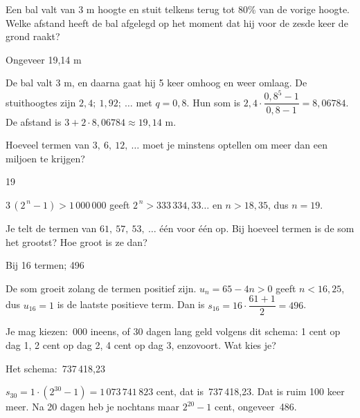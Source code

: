 \begin{oefeningen}
\begin{oefening}[2]
Een bal valt van 3 m hoogte en stuit telkens terug tot 80\% van de vorige hoogte. Welke afstand heeft de bal afgelegd op het moment dat hij voor de zesde keer de grond raakt?
\begin{solution}
Ongeveer 19,14 m
\end{solution}
\begin{fullsolution}
De bal valt 3 m, en daarna gaat hij 5 keer omhoog en weer omlaag. De stuithoogtes zijn $2{,}4;\ 1{,}92;\ \ldots$ met $q=0{,}8$. Hun som is $2{,}4\cdot\dfrac{0{,}8^5-1}{0{,}8-1}=8{,}06784$. De afstand is $3+2\cdot 8{,}06784\approx 19{,}14$ m.
\end{fullsolution}
\end{oefening}

\begin{oefening}[2]
Hoeveel termen van $3,\ 6,\ 12,\ \ldots$ moet je minstens optellen om meer dan een miljoen te krijgen?
\begin{solution}
19
\end{solution}
\begin{fullsolution}
$3\,(2^{\,n}-1)>1\,000\,000$ geeft $2^{\,n}>333\,334{,}33\ldots$ en $n>18{,}35$, dus $n=19$.
\end{fullsolution}
\end{oefening}

\begin{oefening}[2]
Je telt de termen van $61,\ 57,\ 53,\ \ldots$ één voor één op. Bij hoeveel termen is de som het grootst? Hoe groot is ze dan?
\begin{solution}
Bij 16 termen; 496
\end{solution}
\begin{fullsolution}
De som groeit zolang de termen positief zijn. $u_n=65-4n>0$ geeft $n<16{,}25$, dus $u_{16}=1$ is de laatste positieve term. Dan is $s_{16}=16\cdot\dfrac{61+1}{2}=496$.
\end{fullsolution}
\end{oefening}

\begin{oefening}[2]
Je mag kiezen: \,000 ineens, of 30 dagen lang geld volgens dit schema: 1 cent op dag 1, 2 cent op dag 2, 4 cent op dag 3, enzovoort. Wat kies je?
\begin{solution}
Het schema: \,737\,418,23
\end{solution}
\begin{fullsolution}
$s_{30}=1\cdot(2^{30}-1)=1\,073\,741\,823$ cent, dat is \,737\,418,23. Dat is ruim 100 keer meer. Na 20 dagen heb je nochtans maar $2^{20}-1$ cent, ongeveer \,486.
\end{fullsolution}
\end{oefening}


\end{oefeningen}
